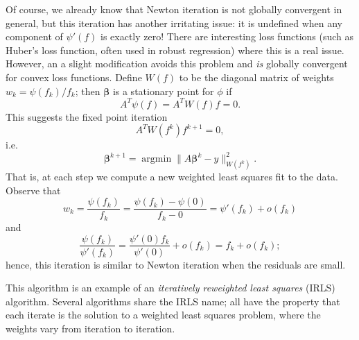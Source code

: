 \documentclass[12pt, leqno]{article} %
\newcommand{\bfbeta}{\boldsymbol{\beta}}
\begin{document}
Of course, we already know that Newton iteration is not globally
convergent in general, but this iteration has another irritating issue:
it is undefined when any component of $\psi'(f)$ is exactly zero!
There are interesting loss functions (such as Huber's loss function,
often used in robust regression) where this is a real issue.
However, an a slight modification avoids this problem and {\em is}
globally convergent for convex loss functions.
Define $W(f)$ to be the diagonal matrix of
weights $w_k = \psi(f_k)/f_k$; then $\bfbeta$ is a stationary point
for $\phi$ if
\[
  A^T \psi(f) = A^T W(f) f = 0.
\]
This suggests the fixed point iteration
\[
  A^T W(f^k) f^{k+1} = 0,
\]
i.e.
\[
  \bfbeta^{k+1} = \operatorname{argmin} \|A\bfbeta^k-y\|_{W(f^k)}^2.
\]
That is, at each step we compute a new weighted least squares fit to
the data.  Observe that
\[
  w_k = \frac{\psi(f_k)}{f_k} = \frac{\psi(f_k)-\psi(0)}{f_k-0} =
  \psi'(f_k) + o(f_k)
\]
and
\[
  \frac{\psi(f_k)}{\psi'(f_k)} = \frac{\psi'(0) f_k}{\psi'(0)} +
  o(f_k) = f_k + o(f_k);
\]
hence, this iteration is similar to Newton iteration when the
residuals are small.

This algorithm is an example of an
{\em iteratively reweighted least squares} (IRLS) algorithm.
Several algorithms share the IRLS name; all
have the property that each iterate is the solution to a weighted
least squares problem, where the weights vary from iteration to
iteration.
\end{document}
